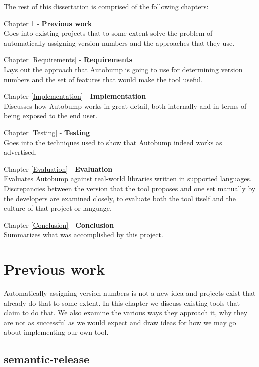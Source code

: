 \documentclass{l4proj}
\begin{document}
The rest of this dissertation is comprised of the following chapters:

\noindent Chapter \ref{PreviousWork} - \textbf{Previous work} \\
Goes into existing projects that to some extent solve the problem
of automatically assigning version numbers and the approaches that
they use.

\noindent Chapter \ref{Requirements} - \textbf{Requirements} \\
Lays out the approach that Autobump is going to use for
determining version numbers and the set of features that would make
the tool useful.

\noindent Chapter \ref{Implementation} - \textbf{Implementation} \\
Discusses how Autobump works in great detail, both internally and
in terms of being exposed to the end user.

\noindent Chapter \ref{Testing} - \textbf{Testing} \\
Goes into the techniques used to show that Autobump indeed works
as advertised.

\noindent Chapter \ref{Evaluation} - \textbf{Evaluation} \\
Evaluates Autobump against real-world libraries written in
supported languages. Discrepancies between the version that the tool
proposes and one set manually by the developers are examined closely,
to evaluate both the tool itself and the culture of that project or language.

\noindent Chapter \ref{Conclusion} - \textbf{Conclusion} \\
Summarizes what was accomplished by this project.

\chapter{Previous work}
\label{PreviousWork}

Automatically assigning version numbers is not a new idea and projects
exist that already do that to some extent. In this chapter we discuss
existing tools that claim to do that. We also examine the various
ways they approach it, why they are not as successful as we would
expect and draw ideas for how we may go about implementing our own tool.

\section{semantic-release}
\end{document}

